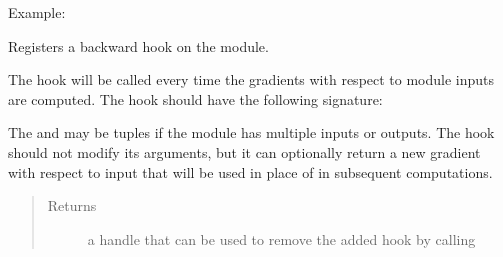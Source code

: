 \documentclass[letterpaper,10pt,english]{sphinxmanual}
\begin{document}
\begin{fulllineitems}
\begin{fulllineitems}
\begin{quote}
\begin{description}
\end{description}\end{quote}

Example:

\begin{sphinxVerbatim}[commandchars=\\\{\}]
   
     
\end{sphinxVerbatim}

\end{fulllineitems}


\begin{fulllineitems}
\label{\detokenize{api/dynamics:geology.metamodelling.dynamics.NeuralDifferentialEquation.register_backward_hook}}
Registers a backward hook on the module.

The hook will be called every time the gradients with respect to module
inputs are computed. The hook should have the following signature:

\begin{sphinxVerbatim}[commandchars=\\\{\}]
      
\end{sphinxVerbatim}

The  and  may be tuples if the
module has multiple inputs or outputs. The hook should not modify its
arguments, but it can optionally return a new gradient with respect to
input that will be used in place of  in subsequent
computations.
\begin{quote}\begin{description}
\item[{Returns}] \leavevmode
a handle that can be used to remove the added hook by calling


\end{description}
\end{quote}
\end{fulllineitems}
\end{fulllineitems}
\end{document}
